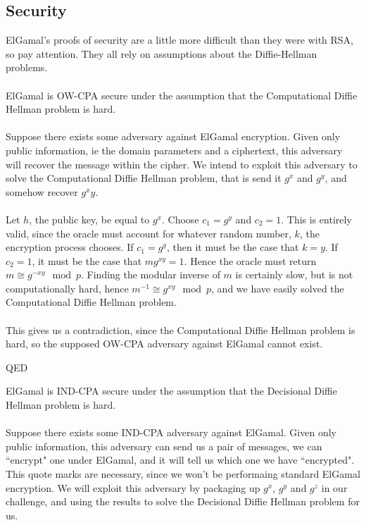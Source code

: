 	\subsection{Security}
	ElGamal's proofs of security are a little more difficult than they were with RSA, so pay attention. They all rely on assumptions about the Diffie-Hellman problems.\\
\\
	ElGamal is OW-CPA secure under the assumption that the Computational Diffie Hellman problem is hard.\\
\\
	Suppose there exists some adversary against ElGamal encryption. Given only public information, ie the domain parameters and a ciphertext, this adversary will recover the message within the cipher. We intend to exploit this adversary to solve the Computational Diffie Hellman problem, that is send it $g^x$ and $g^y$, and somehow recover $g^xy$.\\
\\
	Let $h$, the public key, be equal to $g^x$. Choose $c_1 = g^y$ and $c_2 = 1$. This is entirely valid, since the oracle must account for whatever random number, $k$, the encryption process chooses. If $c_1 = g^y$, then it must be the case that $k=y$. If $c_2=1$, it must be the case that $mg^{xy} = 1$. Hence the oracle must return $m \cong g^{-xy} \mod p$. Finding the modular inverse of $m$ is certainly slow, but is not computationally hard, hence $m^{-1} \cong g^{xy} \mod p$, and we have easily solved the Computational Diffie Hellman problem.\\
\\
	This gives us a contradiction, since the Computational Diffie Hellman problem is hard, so the supposed OW-CPA adversary against ElGamal cannot exist.
\begin{flushright}
QED\\
\end{flushright}
	ElGamal is IND-CPA secure under the assumption that the Decisional Diffie Hellman problem is hard.\\
\\
	Suppose there exists some IND-CPA adversary against ElGamal. Given only public information, this adversary can send us a pair of messages, we can ``encrypt" one under ElGamal, and it will tell us which one we have ``encrypted". This quote marks are necessary, since we won't be performaing standard ElGamal encryption. We will exploit this adversary by packaging up $g^x$, $g^y$ and $g^z$ in our challenge, and using the results to solve the Decisional Diffie Hellman problem for us.\\
